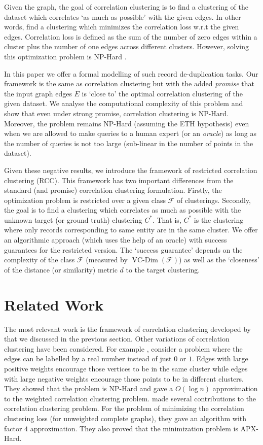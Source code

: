 \documentclass[12pt]{article}
\newcommand{\mc}{\mathcal}
\DeclareMathOperator*{\vcdim}{VC-Dim}
\begin{document}
Given the graph, the goal of correlation clustering is to find a clustering of the dataset which correlates `as much as possible' with the given edges. In other words, find a clustering which minimizes the correlation loss w.r.t the given edges. Correlation loss is defined as the sum of the number of zero edges within a cluster plus the number of one edges across different clusters. However, solving this optimization problem is NP-Hard \cite{bansal2004correlation}. 
  
In this paper we offer a formal modelling of such record de-duplication tasks. Our framework is the same as correlation clustering but with the added \textit{promise} that the input graph edges $E$ is `close to' the optimal correlation clustering of the given dataset. We analyse the computational complexity of this problem and show that even under strong promise, correlation clustering is NP-Hard. Moreover, the problem remains NP-Hard (assuming the ETH hypothesis) even when we are allowed to make queries to a human expert (or an \textit{oracle}) as long as the number of queries is not too large (sub-linear in the number of points in the dataset). 

Given these negative results, we introduce the framework of restricted correlation clustering (RCC). This framework has two important differences from the standard (and promise) correlation clustering formulation. Firstly, the optimization problem is restricted over a given class $\mc F$ of clusterings. Secondly, the goal is to find a clustering which correlates as much as possible with the unknown target (or ground truth) clustering $C^*$. That is, $C^*$ is the clustering where only records corresponding to same entity are in the same cluster. We offer an algorithmic approach (which uses the help of an oracle) with success guarantees for the restricted version. The `success guarantee' depends on the complexity of the class $\mc F$ (measured by $\vcdim(\mc F)$) as well as the `closeness' of the distance (or similarity) metric $d$ to the target clustering.

\section{Related Work}
The most relevant work is the framework of correlation clustering developed by \cite{bansal2004correlation} that we discussed in the previous section. Other variations of correlation clustering have been considered. For example \cite{demaine2006correlation}, consider a problem where the edges can be labelled by a real number instead of just $0$ or $1$. Edges with large positive weights encourage those vertices to be in the same cluster while edges with large negative weights encourage those points to be in different clusters. They showed that the problem is NP-Hard and gave a $O(\log n)$ approximation to the weighted correlation clustering problem. \cite{charikar2005clustering} made several contributions to the correlation clustering problem. For the problem of minimizing the correlation clustering loss (for unweighted complete graphs), they gave an algorithm with factor $4$ approximation. They also proved that the minimization problem is APX-Hard. 
\end{document}
